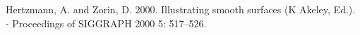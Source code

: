\documentclass[12pt,twoside,a4paper, a]{article}
\newlength{\cslhangindent}
\newenvironment{CSLReferences}[2] %
 {%
  \setlength{\parindent}{0pt}
  \ifodd #1 \everypar{\setlength{\hangindent}{\cslhangindent}}\ignorespaces\fi
  \ifnum #2 > 0
  \setlength{\parskip}{#2\baselineskip}
  \fi
 }%
 {}
\begin{document}
\hypertarget{refs}{}
\begin{CSLReferences}{1}{0}
\leavevmode{}%
Hertzmann, A. and Zorin, D. 2000. Illustrating smooth surfaces (K Akeley, Ed.). - Proceedings of SIGGRAPH 2000 5: 517--526.

\end{CSLReferences}



\end{document}
